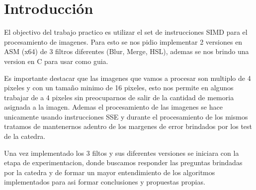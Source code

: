 \section{Introducción}

El objectivo del trabajo practico es utilizar el set de instrucciones SIMD para el procesamiento de imagenes.
Para esto se nos pidio implementar 2 versiones en ASM (x64) de 3 filtros diferentes (Blur, Merge, HSL), ademas se nos brindo una version en C para usar como guia.

Es importante destacar que las imagenes que vamos a procesar son multiplo de 4 pixeles y con un tamaño minimo de 16 pixeles, esto nos permite en algunos trabajar de a 4 pixeles sin preocuparnos de salir de la cantidad de memoria asignada a la imagen.
Ademas el procesamiento de las imagenes se hace unicamente usando instrucciones SSE y durante el procesamiento de los mismos tratamos de mantenernos adentro de los margenes de error brindados por los test de la catedra.

Una vez implementado los 3 filtos y sus diferentes versiones se iniciara con la etapa de experimentacion, donde buscamos responder las preguntas brindadas por la catedra y de formar un mayor entendimiento de los algoritmos implementados para asi formar conclusiones y propuestas propias.